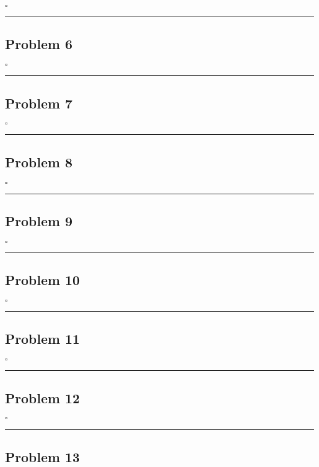 \documentclass[12pt]{article}
\newcommand*{\QEDB}{\hfill\ensuremath{\square}}
\newcommand{\horrule}[1]{\rule{\linewidth}{#1}}
\begin{document}
\QEDB

\horrule{0.5pt}

\subsection*{Problem 6}

\QEDB

\horrule{0.5pt}

\subsection*{Problem 7}

\QEDB

\horrule{0.5pt}

\subsection*{Problem 8}

\QEDB

\horrule{0.5pt}

\subsection*{Problem 9}

\QEDB

\horrule{0.5pt}

\subsection*{Problem 10}

\QEDB

\horrule{0.5pt}

\subsection*{Problem 11}

\QEDB

\horrule{0.5pt}

\subsection*{Problem 12}

\QEDB

\horrule{0.5pt}

\subsection*{Problem 13}
\end{document}
